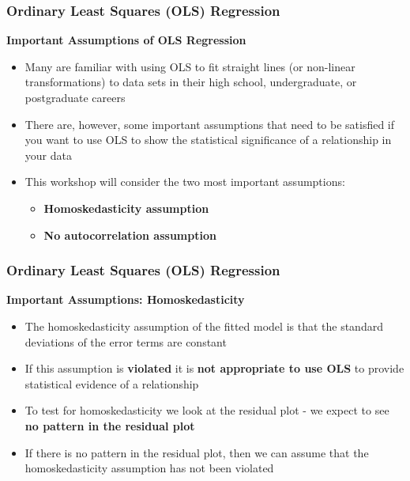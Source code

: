 \documentclass{beamer}
\begin{document}
\begin{frame}
\frametitle{Ordinary Least Squares (OLS) Regression}
\textbf{Important Assumptions of OLS Regression}\\
\vspace{0.3cm}
\begin{itemize}
\item Many are familiar with using OLS to fit straight lines (or non-linear transformations) to data sets in their high school, undergraduate, or postgraduate careers
\vspace{0.3cm}
\item There are, however, some important assumptions that need to be satisfied if you want to use OLS to show the statistical significance of a relationship in your data
\vspace{0.3cm}
\item This workshop will consider the two most important assumptions:
\vspace{0.1cm}
\begin{itemize}
\item \textbf{Homoskedasticity assumption}
\vspace{0.1cm}
\item \textbf{No autocorrelation assumption}
\end{itemize}
\end{itemize}
\end{frame}


\begin{frame}
\frametitle{Ordinary Least Squares (OLS) Regression}
\textbf{Important Assumptions: Homoskedasticity}\\
\vspace{0.3cm}
\begin{itemize}
\item The homoskedasticity assumption of the fitted model is that the standard deviations of the error terms are constant
\vspace{0.2cm}
\item If this assumption is \textbf{violated} it is \textbf{not appropriate to use OLS} to provide statistical evidence of a relationship
\vspace{0.2cm}
\item To test for homoskedasticity we look at the residual plot - we expect to see \textbf{no pattern in the residual plot}\vspace{0.2cm}
\item If there is no pattern in the residual plot, then we can assume that the homoskedasticity assumption has not been violated
\end{itemize}
\end{frame}
\end{document}
